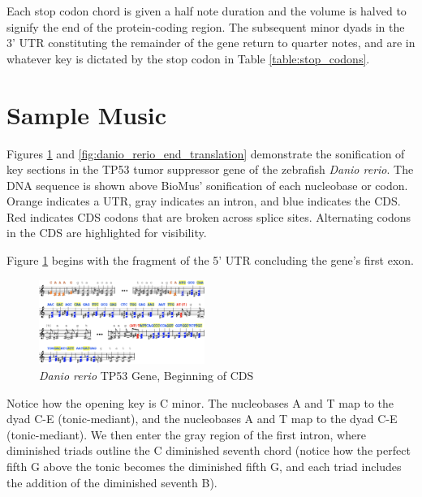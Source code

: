 \documentclass[letterpaper]{article}
\begin{document}
Each stop codon chord is given a half note duration and the volume is halved to signify the end of the protein-coding region. The subsequent minor dyads in the 3' UTR constituting the remainder of the gene return to quarter notes, and are in whatever key is dictated by the stop codon in Table \ref{table:stop_codons}. 



\section{Sample Music}

Figures \ref{fig:danio_rerio_start_translation} and \ref{fig:danio_rerio_end_translation} demonstrate the sonification of key sections in the TP53 tumor suppressor gene of the zebrafish \textit{Danio rerio}. The DNA sequence is shown above BioMus' sonification of each nucleobase or codon. Orange indicates a UTR, gray indicates an intron, and blue indicates the CDS. Red indicates CDS codons that are broken across splice sites. Alternating codons in the CDS are highlighted for visibility.

Figure \ref{fig:danio_rerio_start_translation} begins with the fragment of the 5' UTR concluding the gene's first exon. 

\begin{figure}[h!]
\centering
\includegraphics[width=0.48\textwidth]{images/danio_rerio_start_translation}
\vspace{-3mm}
  \caption{\textit{Danio rerio} TP53 Gene, Beginning of CDS}
  \label{fig:danio_rerio_start_translation}
  \vspace{-3mm}
\end{figure}

Notice how the opening key is C minor. The nucleobases A and T map to the dyad C-E\musFlat \; (tonic-mediant), and the nucleobases A and T map to the dyad C-E\musFlat \; (tonic-mediant). We then enter the gray region of the first intron, where diminished triads outline the C diminished seventh chord (notice how the perfect fifth G above the tonic becomes the diminished fifth G\musFlat, and each triad includes the addition of the diminished seventh B\musDoubleFlat). 
\end{document}
